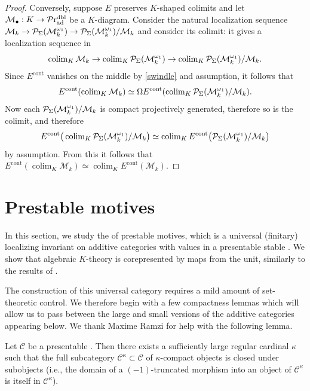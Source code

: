 \documentclass[a4paper,10pt, oneside]{amsart}
\begin{document}
\begin{proof}
		 Conversely, suppose $E$ preserves $K$-shaped colimits and let $\mathcal{M}_{\bullet}: K \rightarrow \mathcal{P}\mathrm{r}_{\mathrm{ad}}^{\mathrm{dbl}}$ be a $K$-diagram. Consider the natural localization sequence $\mathcal{M}_k \rightarrow \mathcal{P}_{\Sigma}(\mathcal{M}_k^{\omega_1}) \rightarrow \mathcal{P}_{\Sigma}(\mathcal{M}_k^{\omega_1})/\mathcal{M}_k$ and consider its colimit: it gives a localization sequence in \praddbl $$\operatorname{colim}_K \mathcal{M}_k \rightarrow \operatorname{colim}_K \mathcal{P}_{\Sigma}(\mathcal{M}_k^{\omega_1}) \rightarrow \operatorname{colim}_K \mathcal{P}_{\Sigma}(\mathcal{M}_k^{\omega_1})/\mathcal{M}_k.$$
		 Since $E^{\text{cont}}$ vanishes on the middle \infcat by \cref{swindle} and assumption, it follows that $$E^{\text{cont}}(\operatorname{colim}_K \mathcal{M}_k) \simeq \Omega E^{\text{cont}}(\operatorname{colim}_K \mathcal{P}_{\Sigma}(\mathcal{M}_k^{\omega_1})/\mathcal{M}_k).$$ Now each $\mathcal{P}_{\Sigma}(\mathcal{M}_k^{\omega_1})/\mathcal{M}_k$ is compact projectively generated, therefore so is the colimit, and therefore 
		 $$
		 E^{\text{cont}}\big(\operatorname{colim}_K \mathcal{P}_{\Sigma}(\mathcal{M}_k^{\omega_1})/\mathcal{M}_k\big)  \simeq \operatorname{colim}_K E^{\text{cont}}\big( \mathcal{P}_{\Sigma}(\mathcal{M}_k^{\omega_1})/\mathcal{M}_k\big)
		 $$ by assumption.
		 From this it follows that $E^{\text{cont}}\left(\operatorname{colim}_K \mathcal{M}_k\right) \simeq \operatorname{colim}_K E^{\text{cont}}\left(\mathcal{M}_k\right)$.
	\end{proof}
	
	
	\section{Prestable motives}\label{sec:prestable_motives}
	In this section, we study the \infcat of prestable motives, which is a universal
	(finitary) localizing invariant on additive categories with values in a presentable stable \infcat.
	We show that algebraic $K$-theory is corepresented by maps from the unit, similarly to the results of
	\cite{blumberg2013universal}.
	
The construction of this universal category requires a mild amount of
set-theoretic control.   We therefore begin with a few compactness lemmas which will
allow us to pass between the large and small versions of the additive categories
appearing below.
	We thank Maxime Ramzi for help with the following lemma.
	\begin{lem}\label{kcompmono}
		Let $\mathcal{C}$ be a presentable \infcat. Then there exists a sufficiently large regular cardinal $\kappa$ such that the full subcategory $\mathcal{C}^\kappa \subset \mathcal{C}$ of $\kappa$-compact objects is closed under subobjects (i.e., the domain of a $(-1)$-truncated morphism into an object of $\mathcal{C}^\kappa$ is itself in $\mathcal{C}^\kappa$). 
	\end{lem}
	
\end{document}
